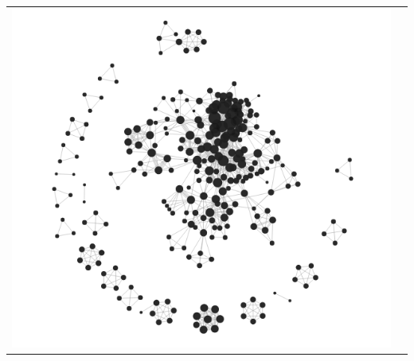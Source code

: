 \begin{center}
\begin{tabular}{cc}
\includegraphics[trim={0 0 0 0}, width=140mm]{./Figures/TurinLocalCentralityFull.png}
\end{tabular}
\label{fig:TurinLocalCentralityFull}
\end{center}

